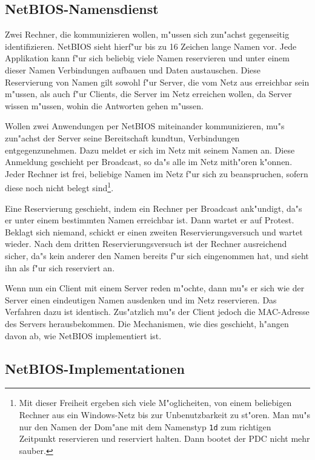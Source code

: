 \documentclass{scrartcl}\usepackage{pslatex}\typearea{12}
\newcommand{\nbname}{\texttt}
\begin{document}
\subsection{NetBIOS-Namensdienst}

Zwei Rechner, die kommunizieren wollen, m"ussen sich zun"achst gegenseitig
identifizieren. NetBIOS sieht hierf"ur bis zu 16 Zeichen lange Namen
vor.  Jede Applikation kann f"ur sich beliebig viele Namen reservieren
und unter einem dieser Namen Verbindungen aufbauen und Daten austauschen.
Diese Reservierung von Namen gilt sowohl f"ur Server, die vom Netz aus
erreichbar sein m"ussen, als auch f"ur Clients, die Server im Netz
erreichen wollen, da Server wissen m"ussen, wohin die Antworten
gehen m"ussen.

Wollen zwei Anwendungen per NetBIOS miteinander kommunizieren, mu"s
zun"achst der Server seine Bereitschaft kundtun, Verbindungen
entgegenzunehmen. Dazu meldet er sich im Netz mit seinem Namen an.
Diese Anmeldung geschieht per Broadcast, so da"s alle im Netz
mith"oren k"onnen. Jeder Rechner ist frei, beliebige Namen im Netz
f"ur sich zu beanspruchen, sofern diese noch nicht belegt
sind\footnote{Mit dieser Freiheit ergeben sich viele M"oglicheiten,
  von einem beliebigen Rechner aus ein Windows-Netz bis zur
  Unbenutzbarkeit zu st"oren. Man mu"s nur den Namen der Dom"ane mit
  dem Namenstyp \nbname{1d} zum richtigen Zeitpunkt reservieren und
  reserviert halten. Dann bootet der PDC nicht mehr sauber.}.

Eine Reservierung geschieht, indem ein Rechner per Broadcast
ank"undigt, da"s er unter einem bestimmten Namen erreichbar ist. Dann
wartet er auf Protest. Beklagt sich niemand, schickt er einen zweiten
Reservierungsversuch und wartet wieder. Nach dem dritten
Reservierungsversuch ist der Rechner ausreichend sicher, da"s kein
anderer den Namen bereits f"ur sich eingenommen hat, und sieht ihn als
f"ur sich reserviert an.

Wenn nun ein Client mit einem Server reden m"ochte, dann mu"s er sich
wie der Server einen eindeutigen Namen ausdenken und im Netz
reservieren. Das Verfahren dazu ist identisch. Zus"atzlich mu"s der
Client jedoch die MAC-Adresse des Servers herausbekommen. Die
Mechanismen, wie dies geschieht, h"angen davon ab, wie NetBIOS
implementiert ist.

\subsection{NetBIOS-Implementationen}
\end{document}
